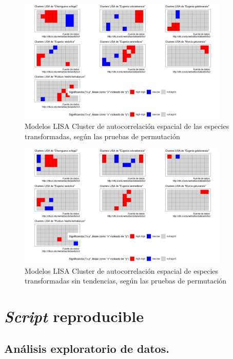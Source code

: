 \documentclass[11pt,]{article}
\begin{document}
\begin{figure}
\centering
\includegraphics[width=0.90000\textwidth]{LISA_espc_trans.png}
\caption{Modelos LISA Cluster de autocorrelación espacial de las
especies transformadas, según las pruebas de
permutación\label{fig:espc_perm}}
\end{figure}

\begin{figure}
\centering
\includegraphics[width=0.90000\textwidth]{LISA_espc_sin_tend.png}
\caption{Modelos LISA Cluster de autocorrelación espacial de especies
transformadas sin tendencias, según las pruebas de
permutación\label{fig:sinten}}
\end{figure}

\section{\texorpdfstring{\emph{Script}
reproducible}{Script reproducible}}\label{script-reproducible}

\subsection{Análisis exploratorio de
datos.}\label{anuxe1lisis-exploratorio-de-datos.}
\end{document}
